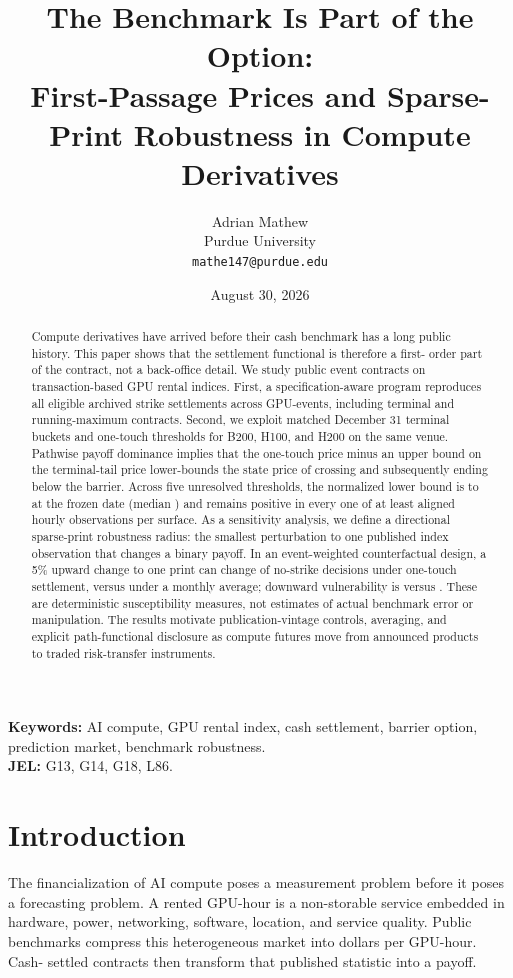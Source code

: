 \documentclass[10pt,twocolumn]{article}
\title{\textbf{The Benchmark Is Part of the Option:}\\
First-Passage Prices and Sparse-Print Robustness in Compute Derivatives}
\author{Adrian Mathew\\
Purdue University\\
\texttt{mathe147@purdue.edu}}
\date{August 30, 2026}
\begin{document}
\maketitle

\begin{abstract}
Compute derivatives have arrived before their cash benchmark has a long public
history. This paper shows that the settlement functional is therefore a first-
order part of the contract, not a back-office detail. We study public event
contracts on transaction-based GPU rental indices. First, a specification-aware
program reproduces all \NContracts{} eligible archived strike settlements across
\NEvents{} GPU-events, including terminal and running-maximum contracts. Second,
we exploit matched December 31 terminal buckets and one-touch thresholds for
B200, H100, and H200 on the same venue. Pathwise payoff dominance implies that
the one-touch price minus an upper bound on the terminal-tail price lower-bounds
the state price of crossing and subsequently ending below the barrier. Across
five unresolved thresholds, the normalized lower bound is \MinBound{} to \MaxBound{}
at the frozen date (median \MedianBound{}) and remains positive in every one of
at least \MinHours{} aligned hourly observations per surface. As a sensitivity
analysis, we define a
directional sparse-print robustness radius: the smallest perturbation to one
published index observation that changes a binary payoff. In an event-weighted
counterfactual design, a 5\% upward change to one print can change \TouchFiveFP{}
of no-strike decisions under one-touch settlement, versus \MeanFiveFP{} under a
monthly average; downward vulnerability is \TouchFiveFNAll{} versus
\MeanFiveFNAll{}. These are
deterministic susceptibility measures, not estimates of actual benchmark error
or manipulation. The results motivate publication-vintage controls, averaging,
and explicit path-functional disclosure as compute futures move from announced
products to traded risk-transfer instruments.
\end{abstract}

\noindent\textbf{Keywords:} AI compute, GPU rental index, cash settlement,
barrier option, prediction market, benchmark robustness.\\
\textbf{JEL:} G13, G14, G18, L86.

\section{Introduction}

The financialization of AI compute poses a measurement problem before it poses
a forecasting problem. A rented GPU-hour is a non-storable service embedded in
hardware, power, networking, software, location, and service quality. Public
benchmarks compress this heterogeneous market into dollars per GPU-hour. Cash-
settled contracts then transform that published statistic into a payoff.
\end{document}
